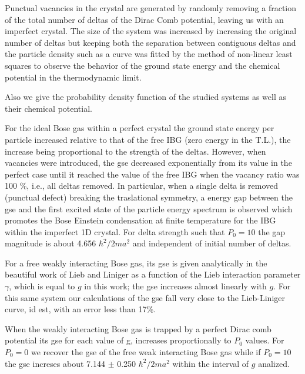 \documentclass[twocolumn,showpacs,showkeys,preprintnumbers,superscriptaddress, pra, 10pt, aps]{revtex4-2}
\begin{document}
Punctual vacancies in the crystal are generated by randomly removing a fraction of the total number of deltas of the Dirac Comb potential, leaving us with an imperfect crystal. The size of the system was increased by increasing the original number of  deltas but keeping both the separation between contiguous deltas and the particle density such as a curve was fitted by the method of non-linear least squares to observe the behavior of the ground state energy and the chemical potential in the thermodynamic limit.

Also we give the probability density function of the studied systems as well as their chemical potential.

For the ideal Bose gas within a perfect crystal
the ground state energy per particle increased
relative to that of the free IBG (zero energy in the T.L.), the increase being proportional to the strength of the deltas. However, when vacancies were introduced, the gse decreased exponentially from its value in the perfect case until it reached the value of the free IBG when the vacancy ratio was 100 \%, i.e., all deltas removed. In particular, when a single delta is removed (punctual defect) breaking the traslational symmetry,
a energy gap between the gse and the first excited state of the particle energy spectrum is observed which promotes the Bose Einstein condensation at finite temperature for the IBG within the imperfect 1D crystal. For delta strength such that $P_0 = 10$ the gap magnitude is about 4.656 $\hbar^2/2ma^2$ and independent of initial number of deltas.
%

For a free weakly interacting Bose gas, its gse is given analytically in the beautiful work of Lieb and Liniger \cite{LL} as a function of the Lieb interaction parameter $\gamma$, which is equal to $g$ in this work;
the gse increases almost linearly with $g$. For this same system our calculations of the gse  fall very close to the Lieb-Liniger curve, id est, with an error less than 17\%.

When the weakly interacting Bose gas is trapped by a perfect Dirac comb potential its gse for each value of g, increases proportionally to $P_0$ values. For $P_0 = 0$ we recover the gse of the free weak interacting Bose gas while if $P_0 = 10$ the gse increses about 7.144 $\pm$ 0.250 $\hbar^2/2m a^2$ within the interval of $g$ analized.
\end{document}
